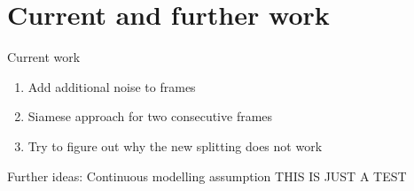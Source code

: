 \section{Current and further work}
\begin{frame}{Current work}
\begin{enumerate}
\item Add additional noise to frames
\item Siamese approach for two consecutive frames
\item Try to figure out why the new splitting does not work
\end{enumerate}
\end{frame}

\begin{frame}{Further ideas: Continuous modelling assumption}
THIS IS JUST A TEST
\end{frame}